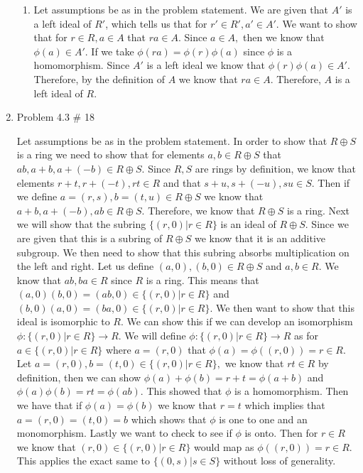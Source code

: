 \documentclass[11pt]{article}
\begin{document}
\begin{enumerate}
\begin{enumerate}
    \item
    
    Let assumptions be as in the problem statement. We are given that $A'$ is a left ideal of $R'$, which tells us that for $r'\in R', a'\in A'$. We want to show that for $r\in R, a\in A$ that $ra\in A$. Since $a\in A,$ then we know that $\phi(a)\in A'$. If we take $\phi(ra)=\phi(r)\phi(a)$ since $\phi$ is a homomorphism. Since $A'$ is a left ideal we know that $\phi(r)\phi(a)\in A'$. Therefore, by the definition of $A$ we know that $ra\in A$. Therefore, $A$ is a left ideal of $R$.
    
\end{enumerate}

\pagebreak
\item Problem 4.3 \# 18

Let assumptions be as in the problem statement. In order to show that $R \oplus S$ is a ring we need to show that for elements $a,b\in R\oplus S$ that $ab, a+b, a+(-b)\in R\oplus S$. Since $R,S$ are rings by definition, we know that elements $r+t, r+(-t), rt\in R$ and that $s+u, s+(-u), su\in S$. Then if we define $a = (r,s), b=(t,u)\in R\oplus S$ we know that $a+b, a+(-b), ab\in R\oplus S$. Therefore, we know that $R\oplus S$ is a ring. Next we will show that the subring $\{(r, 0)|r\in R\}$ is an ideal of $R\oplus S$. Since we are given that this is a subring of $R\oplus S$ we know that it is an additive subgroup. We then need to show that this subring absorbs multiplication on the left and right. Let us define $(a,0), (b, 0)\in R\oplus S$ and $a,b\in R$. We know that $ab,ba\in R$ since $R$ is a ring. This means that $(a,0)(b,0) = (ab,0)\in \{(r,0)|r\in R\}$ and $(b,0)(a,0)=(ba,0)\in \{(r,0)|r\in R\}$. We then want to show that this ideal is isomorphic to $R$. We can show this if we can develop an isomorphism $\phi: \{(r,0)|r\in R\}\rightarrow R$. We will define $\phi: \{(r,0)|r\in R\}\rightarrow R$ as for $a\in \{(r,0)|r\in R\}$ where $a = (r,0)$ that $\phi(a) = \phi((r,0)) = r\in R$. Let $a = (r, 0), b = (t, 0)\in \{(r,0)|r\in R\},$ we know that $rt\in R$ by definition, then we can show $\phi(a)+\phi(b) = r + t = \phi(a+b)$ and $\phi(a)\phi(b)=rt = \phi(ab)$. This showed that $\phi$ is a homomorphism. Then we have that if $\phi(a)=\phi(b)$ we know that $r = t$ which implies that $a = (r,0) = (t, 0) = b$ which shows that $\phi$ is one to one and an monomorphism. Lastly we want to check to see if $\phi$ is onto. Then for $r\in R$ we know that $(r, 0)\in \{(r,0)|r\in R\}$ would map as $\phi((r,0)) = r\in R$. This applies the exact same to $\{(0, s)|s\in S\}$ without loss of generality. 


\end{enumerate}
\end{document}
